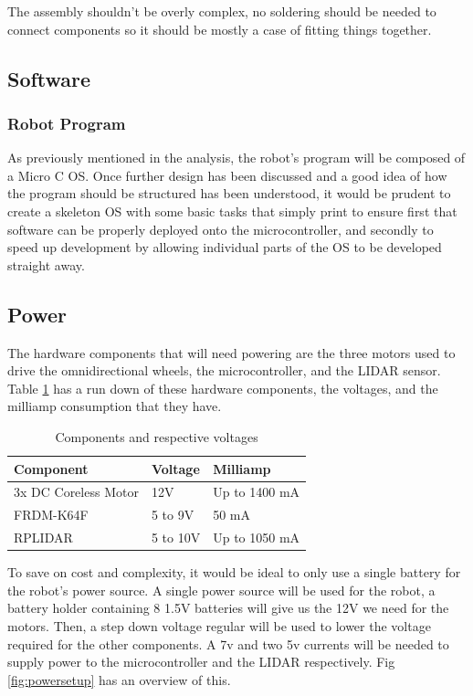 				The assembly shouldn't be overly complex, no soldering should be needed to connect components so it should be mostly a case of fitting things together.
			\subsection{Software}
				\subsubsection{Robot Program}
				As previously mentioned in the analysis, the robot's program will be composed of a Micro C OS. Once further design has been discussed and a good idea of how the program should be structured has been understood, it would be prudent to create a skeleton OS with some basic tasks that simply print to ensure first that software can be properly deployed onto the microcontroller, and secondly to speed up development by allowing individual parts of the OS to be developed straight away.
				
			\subsection{Power}
			The hardware components that will need powering are the three motors used to drive the omnidirectional wheels, the microcontroller, and the LIDAR sensor. Table \ref{table:1} has a run down of these hardware components, the voltages, and the milliamp consumption that they have.
				
			\begin{table}[h]
				\centering
				\begin{tabular}{|| l | l | l ||} 
					\hline
					Component & Voltage & Milliamp \\ [0.5ex] 
					\hline
					3x DC Coreless Motor  & 12V & Up to 1400 mA  \\ 
					FRDM-K64F  & 5 to 9V &  50 mA \\
					RPLIDAR  & 5 to 10V & Up to 1050 mA\\
					\hline
				\end{tabular}
				\caption{Components and respective voltages}
				\label{table:1}
			\end{table}
			
			To save on cost and complexity, it would be ideal to only use a single battery for the robot's power source. A single power source will be used for the robot, a battery holder containing 8 1.5V batteries will give us the 12V we need for the motors. Then, a step down voltage regular will be used to lower the voltage required for the other components. A 7v and two 5v currents will be needed to supply power to the microcontroller and the LIDAR respectively. Fig \ref{fig:powersetup} has an overview of this.
				
